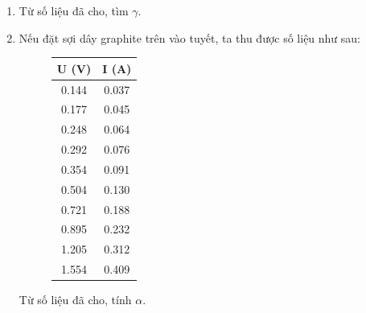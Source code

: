 \begin{enumerate}[label=(\alph*)]
\begin{equation}
    R_g=R_0(1+\gamma P).
\end{equation}
\newpage
\item Từ số liệu đã cho, tìm $\gamma$.
\item Nếu đặt sợi dây graphite trên vào tuyết, ta thu được số liệu như sau:
\begin{figure}[H]
\large{
\begin{tabular}{|c|c|}
\hline
\textbf{U (V)} & \textbf{I (A)} \\
\hline
0.144 & 0.037 \\
0.177 & 0.045 \\
0.248 & 0.064 \\
0.292 & 0.076 \\
0.354 & 0.091 \\
0.504 & 0.130 \\
0.721 & 0.188 \\
0.895 & 0.232 \\
1.205 & 0.312 \\
1.554 & 0.409 \\
\hline
\end{tabular}
}
    \centering
    \caption{}
\end{figure}
Từ số liệu đã cho, tính $\alpha$.
\end{enumerate}